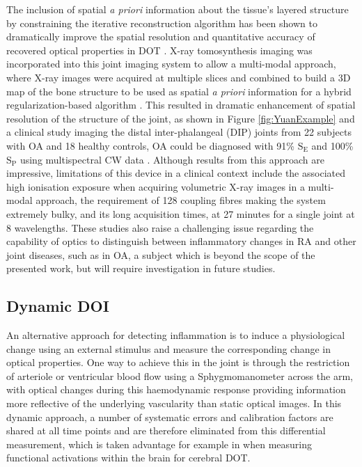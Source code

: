 \documentclass[twoside]{bhamthesis}
\theoremstyle{definition}
\begin{document}
The inclusion of spatial \textit{a priori} information about the tissue's layered structure by constraining the iterative reconstruction algorithm has been shown to dramatically improve the spatial resolution and quantitative accuracy of recovered optical properties in DOT \cite{brooksby2003near,brooksby2005combining}. X-ray tomosynthesis imaging was incorporated into this joint imaging system to allow a multi-modal approach, where X-ray images were acquired at multiple slices and combined to build a 3D map of the bone structure to be used as spatial \textit{a priori} information for a hybrid regularization-based algorithm \cite{yuan2008tomographic}. This resulted in dramatic enhancement of spatial resolution of the structure of the joint, as shown in Figure  
\ref{fig:YuanExample} and a clinical study imaging the distal inter-phalangeal (DIP) joints from 22 subjects with OA and 18 healthy controls, OA could be diagnosed with 91\% $\mathrm{S_E}$ and 100\% $\mathrm{S_P}$ using multispectral CW data \cite{yuan2010image}. Although results from this approach are impressive, limitations of this device in a clinical context include the associated high ionisation exposure when acquiring volumetric X-ray images in a multi-modal approach, the requirement of 128 coupling fibres making the system extremely bulky, and its long acquisition times, at 27 minutes for a single joint at 8 wavelengths.  These studies also raise a challenging issue regarding the capability of optics to distinguish between inflammatory changes in RA and other joint diseases, such as in OA, a subject which is beyond the scope of the presented work, but will require investigation in future studies.

\subsection{Dynamic DOI}
\label{Dynamic DOI}
An alternative approach for detecting inflammation is to induce a physiological change using an external stimulus and measure the corresponding change in optical properties. One way to achieve this in the joint is through the restriction of arteriole or ventricular blood flow using a Sphygmomanometer across the arm, with optical changes during this haemodynamic response providing information more reflective of the underlying vascularity than static optical images. In this dynamic approach, a number of systematic errors and calibration factors are shared at all time points and are therefore eliminated from this differential measurement, which is taken advantage for example in when measuring functional activations within the brain for cerebral DOT.
\end{document}
